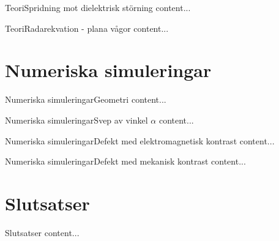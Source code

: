 \documentclass[11pt]{beamer}
\begin{document}
	\begin{frame}{Teori}{Spridning mot dielektrisk störning}
		content...
	\end{frame}

	\begin{frame}{Teori}{Radarekvation - plana vågor}
		content...
	\end{frame}

	\section{Numeriska simuleringar}
	
	\begin{frame}{Numeriska simuleringar}{Geometri}
		content...
	\end{frame}
	
	\begin{frame}{Numeriska simuleringar}{Svep av vinkel $\alpha$}
		content...
	\end{frame}
	
	\begin{frame}{Numeriska simuleringar}{Defekt med elektromagnetisk kontrast}
		content...
	\end{frame}
	
	\begin{frame}{Numeriska simuleringar}{Defekt med mekanisk kontrast}
		content...
	\end{frame}
	
	\section{Slutsatser}
	
	\begin{frame}{Slutsatser}
		content...
	\end{frame}
\end{document}
